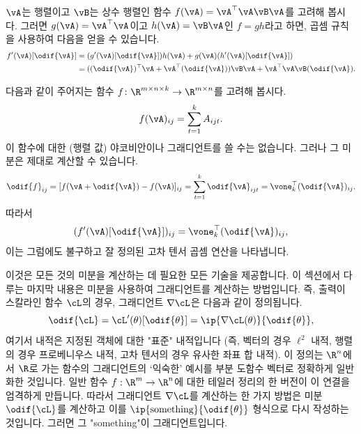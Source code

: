 \documentclass[../../book-main_ko.tex]{subfiles}
\begin{document}
\begin{example}
    \(\vA\)는 행렬이고 \(\vB\)는 상수 행렬인 함수 \(f(\vA) = \vA^{\top}\vA\vB\vA\)를 고려해 봅시다. 그러면 \(g(\vA) = \vA^{\top}\vA\)이고 \(h(\vA) = \vB\vA\)인 \(f = gh\)라고 하면, 곱셈 규칙을 사용하여 다음을 얻을 수 있습니다.
    \begin{align}
        f^{\prime}(\vA)[\odif{\vA}]
        &= (g^{\prime}(\vA)[\odif{\vA}])h(\vA) + g(\vA)(h^{\prime}(\vA)[\odif{\vA}]) \\
        &= ((\odif{\vA})^{\top}\vA + \vA^{\top}(\odif{\vA}))\vB\vA + \vA^{\top}\vA\vB(\odif{\vA}).
    \end{align}
\end{example}

\begin{example}
    다음과 같이 주어지는 함수 \(f \colon \R^{m \times n \times k} \to \R^{m \times n}\)를 고려해 봅시다.
    \begin{equation}
        f(\vA)_{ij} = \sum_{t = 1}^{k}A_{ijt}.
    \end{equation}
    이 함수에 대한 (행렬 값) 야코비안이나 그래디언트를 쓸 수는 없습니다. 그러나 그 미분은 제대로 계산할 수 있습니다.
    \begin{equation}
        \odif{f}_{ij} = [f(\vA + \odif{\vA}) - f(\vA)]_{ij} = \sum_{t = 1}^{k}\odif{\vA}_{ijt} = \vone_{k}^{\top}(\odif{\vA})_{ij}.
    \end{equation}
    따라서
    \begin{equation}
        (f^{\prime}(\vA)[\odif{\vA}])_{ij} = \vone_{k}^{\top}(\odif{\vA})_{ij},
    \end{equation}
    이는 그럼에도 불구하고 잘 정의된 고차 텐서 곱셈 연산을 나타냅니다.
\end{example}

이것은 모든 것의 미분을 계산하는 데 필요한 모든 기술을 제공합니다.
이 섹션에서 다루는 마지막 내용은 미분을 사용하여 그래디언트를 계산하는 방법입니다. 즉, 출력이 스칼라인 함수 \(\cL\)의 경우, 그래디언트 \(\nabla \cL\)은 다음과 같이 정의됩니다.
\begin{equation}
    \odif{\cL} = \cL^{\prime}(\theta)[\odif{\theta}] = \ip{\nabla \cL(\theta)}{\odif{\theta}},
\end{equation}
여기서 내적은 지정된 객체에 대한 "표준" 내적입니다 (즉, 벡터의 경우 \(\ell^{2}\) 내적, 행렬의 경우 프로베니우스 내적, 고차 텐서의 경우 유사한 좌표 합 내적).
이 정의는 $\R^n$에서 $\R$로 가는 함수의 그래디언트의 `익숙한' 예시를 부분 도함수 벡터로 정확하게 일반화한 것입니다. 일반 함수 $f : \R^m \to \R^n$에 대한 테일러 정리의 한 버전이 이 연결을 엄격하게 만듭니다.
따라서 그래디언트 \(\nabla \cL\)를 계산하는 한 가지 방법은 미분 \(\odif{\cL}\)를 계산하고 이를 \(\ip{\text{something}}{\odif{\theta}}\) 형식으로 다시 작성하는 것입니다. 그러면 그 "something"이 그래디언트입니다.
\end{document}
